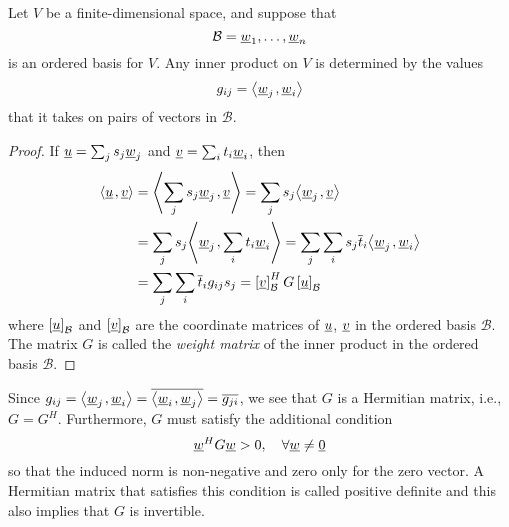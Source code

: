 \begin{theorem}
Let $V$ be a finite-dimensional space, and suppose that
\begin{equation*}
\mathcal{B} = \underline{w}_1, \ldots, \underline{w}_n
\end{equation*}
is an ordered basis for $V$.
Any inner product on $V$ is determined by the values
\begin{equation*}
g_{ij} = {\left\langle  \underline{w}_j  \mskip2mu ,  \underline{w}_i  \right\rangle}
\end{equation*}
that it takes on pairs of vectors in $\mathcal{B}$.
\end{theorem}
\begin{proof}
If $\underline{u} = \sum_{j} s_j \underline{w}_j$ and $\underline{v} = \sum_{i} t_i \underline{w}_i$, then
\begin{equation*}
\begin{split}
{\left\langle  \underline{u}  \mskip2mu ,  \underline{v}  \right\rangle}
&= {\left\langle  \sum_{j} s_j \underline{w}_j  \mskip2mu ,  \underline{v}  \right\rangle}
= \sum_{j} s_j {\left\langle  \underline{w}_j  \mskip2mu ,  \underline{v}  \right\rangle} \\
&= \sum_{j} s_j {\left\langle  \underline{w}_j  \mskip2mu ,  \sum_{i} t_i \underline{w}_i  \right\rangle}
= \sum_{j} \sum_{i} s_j \overline{t}_i {\left\langle  \underline{w}_j  \mskip2mu ,  \underline{w}_i  \right\rangle} \\
&= \sum_{j} \sum_{i} \overline{t}_i g_{ij} s_j
= \left[ \underline{v} \right]_{\mathcal{B}}^H G \left[ \underline{u} \right]_{\mathcal{B}}
\end{split}
\end{equation*}
where $\left[ \underline{u} \right]_{\mathcal{B}}$ and $\left[ \underline{v} \right]_{\mathcal{B}}$ are the coordinate matrices of $\underline{u}$, $\underline{v}$ in the ordered basis $\mathcal{B}$.
The matrix $G$ is called the \emph{weight matrix} of the inner product in the ordered basis $\mathcal{B}$.
\end{proof}

Since $g_{ij} = {\left\langle  \underline{w}_j  \mskip2mu ,  \underline{w}_i  \right\rangle} = \overline{{\left\langle  \underline{w}_i  \mskip2mu ,  \underline{w}_j  \right\rangle}} = \overline{g_{ji}}$, we see that $G$ is a Hermitian matrix, i.e., $G = G^H$.
Furthermore, $G$ must satisfy the additional condition
\begin{equation} \label{equation:PositiveDefinite}
\underline{w}^H G \underline{w} > 0, \quad \forall \underline{w} \neq \underline{0}
\end{equation}
so that the induced norm is non-negative and zero only for the zero vector.
A Hermitian matrix that satisfies this condition is called positive definite and this also implies that $G$ is invertible.

